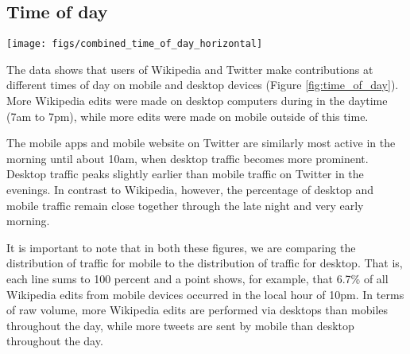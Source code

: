 \documentclass{sigchi}
\begin{document}
\subsection{Time of day}

% 

\begin{figure*}
	\begin{center}
		\texttt{[image: figs/combined\_time\_of\_day\_horizontal]}
		\caption{Edits (left) and tweets (right) by hour of the day grouped across mobile and desktop.}
		\label{fig:time_of_day}
	\end{center}
\end{figure*}

The data shows that users of Wikipedia and Twitter make contributions at different times of day on mobile and desktop devices (Figure \ref{fig:time_of_day}). More Wikipedia edits were made on desktop computers during in the daytime (7am to 7pm), while more edits were made on mobile outside of this time.

The mobile apps and mobile website on Twitter are similarly most active in the morning until about 10am, when desktop traffic becomes more prominent. Desktop traffic peaks slightly earlier than mobile traffic on Twitter in the evenings. In contrast to Wikipedia, however, the percentage of desktop and mobile traffic remain close together through the late night and very early morning.

It is important to note that in both these figures, we are comparing the distribution of traffic for mobile to the distribution of traffic for desktop. That is, each line sums to 100 percent and a point shows, for example, that 6.7\% of all Wikipedia edits from mobile devices occurred in the local hour of 10pm. In terms of raw volume, more Wikipedia edits are performed via desktops than mobiles throughout the day, while more tweets are sent by mobile than desktop throughout the day. 
\end{document}
